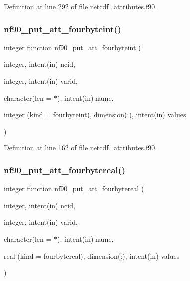 Definition at line 292 of file netcdf\+\_\+attributes.\+f90.

\mbox{\label{netcdf__attributes_8f90_ab67d5496dc028bad90a8b3e56c1f40d2}} 
\subsubsection{\texorpdfstring{nf90\+\_\+put\+\_\+att\+\_\+fourbyteint()}{nf90\_put\_att\_fourbyteint()}}
{\footnotesize\ttfamily integer function nf90\+\_\+put\+\_\+att\+\_\+fourbyteint (\begin{DoxyParamCaption}\item[{integer, intent(in)}]{ncid,  }\item[{integer, intent(in)}]{varid,  }\item[{character(len = $\ast$), intent(in)}]{name,  }\item[{integer (kind = fourbyteint), dimension(\+:), intent(in)}]{values }\end{DoxyParamCaption})}



Definition at line 162 of file netcdf\+\_\+attributes.\+f90.

\mbox{\label{netcdf__attributes_8f90_a19a744e71982424f0959ba3694ec27ef}} 
\subsubsection{\texorpdfstring{nf90\+\_\+put\+\_\+att\+\_\+fourbytereal()}{nf90\_put\_att\_fourbytereal()}}
{\footnotesize\ttfamily integer function nf90\+\_\+put\+\_\+att\+\_\+fourbytereal (\begin{DoxyParamCaption}\item[{integer, intent(in)}]{ncid,  }\item[{integer, intent(in)}]{varid,  }\item[{character(len = $\ast$), intent(in)}]{name,  }\item[{real (kind = fourbytereal), dimension(\+:), intent(in)}]{values }\end{DoxyParamCaption})}



